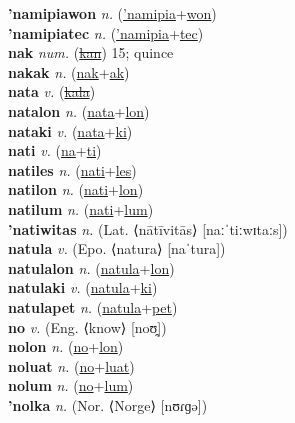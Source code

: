 \textbf{'namipiawon} \textit{n.} (\hyperref['namipia]{'namipia}+\hyperref[won]{won})
 \label{'namipiawon} \\
\textbf{'namipiatec} \textit{n.} (\hyperref['namipia]{'namipia}+\hyperref[tec]{tec})
 \label{'namipiatec} \\
\textbf{nak} \textit{num.} (\hyperref[kan]{\sout{kan}})
15; quince \label{nak} \\
\textbf{nakak} \textit{n.} (\hyperref[nak]{nak}+\hyperref[ak]{ak})
 \label{nakak} \\
\textbf{nata} \textit{v.} (\hyperref[kala]{\sout{kala}})
 \label{nata} \\
\textbf{natalon} \textit{n.} (\hyperref[nata]{nata}+\hyperref[lon]{lon})
 \label{natalon} \\
\textbf{nataki} \textit{v.} (\hyperref[nata]{nata}+\hyperref[ki]{ki})
 \label{nataki} \\
\textbf{nati} \textit{v.} (\hyperref[na]{na}+\hyperref[ti]{ti})
 \label{nati} \\
\textbf{natiles} \textit{n.} (\hyperref[nati]{nati}+\hyperref[les]{les})
 \label{natiles} \\
\textbf{natilon} \textit{n.} (\hyperref[nati]{nati}+\hyperref[lon]{lon})
 \label{natilon} \\
\textbf{natilum} \textit{n.} (\hyperref[nati]{nati}+\hyperref[lum]{lum})
 \label{natilum} \\
\textbf{'natiwitas} \textit{n.} (Lat. ⟨nātīvitās⟩ [naːˈtiːwɪtaːs])
 \label{'natiwitas} \\
\textbf{natula} \textit{v.} (Epo. ⟨natura⟩ [naˈtura])
 \label{natula} \\
\textbf{natulalon} \textit{n.} (\hyperref[natula]{natula}+\hyperref[lon]{lon})
 \label{natulalon} \\
\textbf{natulaki} \textit{v.} (\hyperref[natula]{natula}+\hyperref[ki]{ki})
 \label{natulaki} \\
\textbf{natulapet} \textit{n.} (\hyperref[natula]{natula}+\hyperref[pet]{pet})
 \label{natulapet} \\
\textbf{no} \textit{v.} (Eng. ⟨know⟩ [noʊ̯])
 \label{no} \\
\textbf{nolon} \textit{n.} (\hyperref[no]{no}+\hyperref[lon]{lon})
 \label{nolon} \\
\textbf{noluat} \textit{n.} (\hyperref[no]{no}+\hyperref[luat]{luat})
 \label{noluat} \\
\textbf{nolum} \textit{n.} (\hyperref[no]{no}+\hyperref[lum]{lum})
 \label{nolum} \\
\textbf{'nolka} \textit{n.} (Nor. ⟨Norge⟩ [nʊɾɡə])
